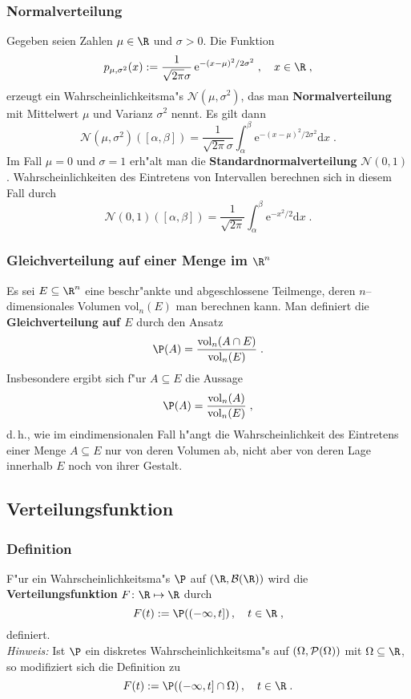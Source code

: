 \subsubsection{Normalverteilung}
Gegeben seien Zahlen $\mu\in\R$ und $\sigma>0$. Die
Funktion
$$
p_{\mu,\sigma^2}(x):= \frac{1}{\sqrt{2\pi}\sigma}\,\mathrm e^{-(x-\mu)^2/2\sigma^2}\;,
\quad x\in\R\;,
$$
erzeugt ein Wahrscheinlichkeitsma"s $\mathcal N(\mu,\sigma^2)$, das
man \textbf{Normalverteilung} mit Mittelwert $\mu$ und Varianz $\sigma^2$ nennt. Es gilt dann
$$
\mathcal N(\mu,\sigma^2)([\alpha,\beta])=\frac{1}{\sqrt{2\pi}\sigma}
\int_\alpha^\beta \mathrm e^{-(x-\mu)^2/2\sigma^2}\mathrm dx\;.
$$
Im Fall $\mu=0$ und $\sigma=1$ erh"alt man die \textbf{Standardnormalverteilung}
$\mathcal N(0,1)$ . Wahrscheinlichkeiten des Eintretens von Intervallen berechnen sich in diesem Fall durch
$$
\mathcal N(0,1)([\alpha,\beta])=\frac{1}{\sqrt{2\pi}}
\int_\alpha^\beta \mathrm e^{-x^2/2}\mathrm dx\;.
$$

\subsubsection{Gleichverteilung auf einer Menge im $\R^n$}
Es sei $E\subseteq \R^n$ eine beschr"ankte und abgeschlossene
Teilmenge, deren $n$--dimensionales Volumen $\mathrm{vol}_n(E)$ man
berechnen kann. Man definiert die \textbf{Gleichverteilung auf $E$} durch den Ansatz
$$
\P(A)=\frac{\mathrm{vol}_n(A\cap E)}{\mathrm{vol}_n(E)}\;.
$$
Insbesondere ergibt sich f"ur $A\subseteq E$ die Aussage
$$
\P(A)=\frac{\mathrm{vol}_n(A)}{\mathrm{vol}_n(E)}\;,
$$
d.\,h., wie im eindimensionalen Fall h"angt die Wahrscheinlichkeit des Eintretens einer Menge $A\subseteq E$
nur von deren Volumen ab, nicht aber von deren Lage innerhalb $E$ noch von ihrer Gestalt.
\subsection{Verteilungsfunktion}
\subsubsection{Definition}
F"ur ein Wahrscheinlichkeitsma"s $\P$ auf $(\R,\fr B(\R))$ wird die
\textbf{Verteilungsfunktion} $F\colon\R\mapsto\R$ durch
\begin{equation}
\label{F0}
F(t):=\P((-\infty,t])\,,\quad t\in\R  \;,
\end{equation}
definiert.\\
\textit{Hinweis:} Ist $\P$ ein diskretes Wahrscheinlichkeitsma"s auf $(\Omega,\mathcal P(\Omega))$ mit $\Omega\subseteq\R$,
so modifiziert sich die Definition zu
$$
F(t):=\P((-\infty,t]\cap\Omega)\,,\quad t\in\R  \;.
$$
